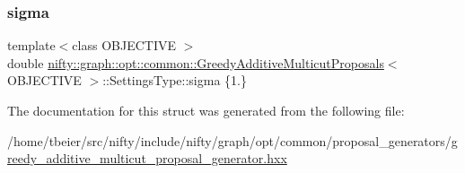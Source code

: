 \subsubsection{\texorpdfstring{sigma}{sigma}}
{\footnotesize\ttfamily template$<$class O\+B\+J\+E\+C\+T\+I\+VE $>$ \\
double \hyperlink{classnifty_1_1graph_1_1opt_1_1common_1_1GreedyAdditiveMulticutProposals}{nifty\+::graph\+::opt\+::common\+::\+Greedy\+Additive\+Multicut\+Proposals}$<$ O\+B\+J\+E\+C\+T\+I\+VE $>$\+::Settings\+Type\+::sigma \{1.\}}



The documentation for this struct was generated from the following file\+:\begin{DoxyCompactItemize}
\item 
/home/tbeier/src/nifty/include/nifty/graph/opt/common/proposal\+\_\+generators/\hyperlink{greedy__additive__multicut__proposal__generator_8hxx}{greedy\+\_\+additive\+\_\+multicut\+\_\+proposal\+\_\+generator.\+hxx}\end{DoxyCompactItemize}
